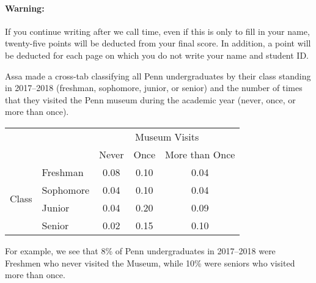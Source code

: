 \documentclass[addpoints,12pt]{exam}
\begin{document}
\paragraph{Warning:} If you continue writing after we call time, even if this is only to fill in your name, twenty-five points will be deducted from your final score. In addition, a point will be deducted for each page on which you do not write your name and student ID. 

\newpage
\begin{questions}

  \question Assa made a cross-tab classifying all Penn undergraduates by their class standing in 2017--2018 (freshman, sophomore, junior, or senior) and the number of times that they visited the Penn museum during the academic year (never, once, or more than once).
  \begin{center}
  \begin{tabular}[h]{ll|ccc}
    && \multicolumn{3}{c}{Museum Visits}\\
    && Never & Once & More than Once \\
    \hline
    & Freshman & 0.08 & 0.10 & 0.04\\
    \multirow{2}{*}{Class} & Sophomore & 0.04 & 0.10 & 0.04\\
    & Junior & 0.04 & 0.20 & 0.09\\
    & Senior & 0.02 & 0.15 & 0.10
  \end{tabular}
\end{center}
For example, we see that 8\% of Penn undergraduates in 2017--2018 were Freshmen who never visited the Museum, while 10\% were seniors who visited more than once.


\end{questions}
\end{document}
